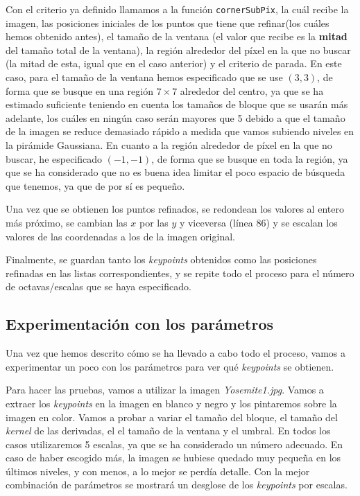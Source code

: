 \documentclass[11pt,a4paper]{article}
\begin{document}
Con el criterio ya definido llamamos a la función \texttt{cornerSubPix},
la cuál recibe la imagen, las posiciones iniciales de los puntos que tiene que
refinar(los cuáles hemos obtenido antes), el tamaño de la ventana (el
valor que recibe es la \textbf{mitad} del tamaño total de la ventana), la región
alrededor del píxel en la que no buscar (la mitad de esta, igual que en el caso
anterior) y el criterio de parada. En este caso, para el tamaño de la ventana hemos
especificado que se use $(3,3)$, de forma que se busque en una región $7 \times 7$
alrededor del centro, ya que se ha estimado suficiente teniendo en cuenta los tamaños
de bloque que se usarán más adelante, los cuáles en ningún caso serán mayores que 5
debido a que el tamaño de la imagen se reduce demasiado rápido a medida que vamos
subiendo niveles en la pirámide Gaussiana. En cuanto a la región alrededor de píxel
en la que no buscar, he especificado $(-1,-1)$, de forma que se busque en toda la región,
ya que se ha considerado que no es buena idea limitar el poco espacio de búsqueda que
tenemos, ya que de por sí es pequeño.

Una vez que se obtienen los puntos refinados, se redondean los valores al entero más
próximo, se cambian las $x$ por las $y$ y viceversa (línea 86) y se escalan los valores
de las coordenadas a los de la imagen original.

Finalmente, se guardan tanto los \textit{keypoints} obtenidos como las posiciones
refinadas en las listas correspondientes, y se repite todo el proceso para el número
de octavas/escalas que se haya especificado.

\subsection{Experimentación con los parámetros}

Una vez que hemos descrito cómo se ha llevado a cabo todo el proceso, vamos
a experimentar un poco con los parámetros para ver qué \textit{keypoints} se
obtienen.

Para hacer las pruebas, vamos a utilizar la imagen \textit{Yosemite1.jpg}. Vamos
a extraer los \textit{keypoints} en la imagen en blanco y negro y los pintaremos
sobre la imagen en color. Vamos a probar a variar el tamaño del bloque, el tamaño
del \textit{kernel} de las derivadas, el el tamaño de la ventana y el umbral. En todos
los casos utilizaremos 5 escalas, ya que se ha considerado un número adecuado. En
caso de haber escogido más, la imagen se hubiese quedado muy pequeña en los últimos
niveles, y con menos, a lo mejor se perdía detalle. Con la mejor combinación de parámetros
se mostrará un desglose de los \textit{keypoints} por escalas.
\end{document}

